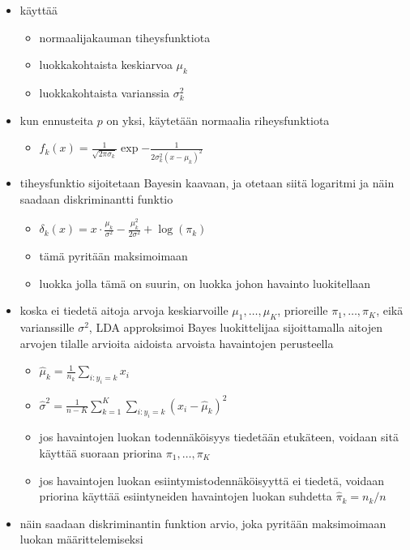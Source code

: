 \documentclass[finnish,twoside,openright]{HYgraduMLDS}
\begin{document}
\begin{itemize}
    \item käyttää
    \begin{itemize}
        \item normaalijakauman tiheysfunktiota
        \item luokkakohtaista keskiarvoa $\mu_k$
        \item luokkakohtaista varianssia $\sigma_k^2$
    \end{itemize}
    \item kun ennusteita $p$ on yksi, käytetään normaalia riheysfunktiota
    \begin{itemize}
        \item $f_k(x) = \frac{1}{\sqrt{2 \pi \sigma_k}} \exp{-\frac{1}{2 \sigma^2_k (x - \mu_k)^2}}$
    \end{itemize}
    \item tiheysfunktio sijoitetaan Bayesin kaavaan, ja otetaan siitä logaritmi ja näin saadaan diskriminantti funktio
    \begin{itemize}
        \item $\delta_k(x) = x \cdot \frac{\mu_k}{\sigma^2} - \frac{\mu^2_k}{2 \sigma^2} + \log(\pi_k)$
        \item tämä pyritään maksimoimaan
        \item luokka jolla tämä on suurin, on luokka johon havainto luokitellaan
    \end{itemize}
    \item koska ei tiedetä aitoja arvoja keskiarvoille $\mu_1, \dots, \mu_K$, prioreille $\pi_1, \dots, \pi_K$, eikä varianssille $\sigma^2$, LDA approksimoi Bayes luokittelijaa sijoittamalla aitojen arvojen tilalle arvioita aidoista arvoista havaintojen perusteella
    \begin{itemize}
        \item $\hat{\mu}_k = \frac{1}{n_k} \sum_{i:y_i = k} x_i$
        \item $\hat{\sigma}^2 = \frac{1}{n - K} \sum^K_{k=1} \sum_{i:y_i = k} (x_i - \hat{\mu}_k)^2$
        \item jos havaintojen luokan todennäköisyys tiedetään etukäteen, voidaan sitä käyttää suoraan priorina $\pi_1, \dots, \pi_K$ 
        \item jos havaintojen luokan esiintymistodennäköisyyttä ei tiedetä, voidaan priorina käyttää esiintyneiden havaintojen luokan suhdetta $\hat{\pi}_k = n_k / n$
    \end{itemize}
    \item näin saadaan diskriminantin funktion arvio, joka pyritään maksimoimaan luokan määrittelemiseksi

\end{itemize}
\end{document}
